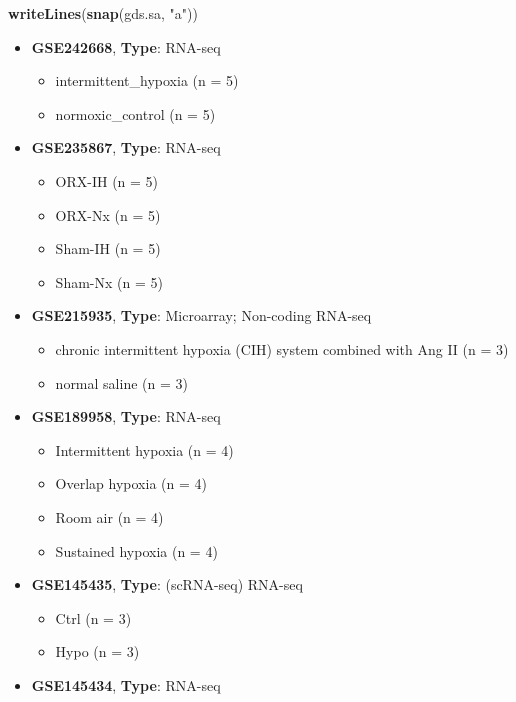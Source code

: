 \documentclass[
]{article}
\newenvironment{Shaded}{\begin{snugshade}}{\end{snugshade}}
\newcommand{\KeywordTok}[1]{\textcolor[rgb]{0.13,0.29,0.53}{\textbf{#1}}}
\newcommand{\NormalTok}[1]{#1}
\newcommand{\StringTok}[1]{\textcolor[rgb]{0.31,0.60,0.02}{#1}}
\providecommand{\tightlist}{%
  \setlength{\itemsep}{0pt}\setlength{\parskip}{0pt}}
\begin{document}
\begin{Shaded}
\begin{Highlighting}[]
\KeywordTok{writeLines}\NormalTok{(}\KeywordTok{snap}\NormalTok{(gds.sa, }\StringTok{"a"}\NormalTok{))}
\end{Highlighting}
\end{Shaded}

\begin{itemize}
\tightlist
\item
  \textbf{GSE242668}, \textbf{Type}: RNA-seq

  \begin{itemize}
  \tightlist
  \item
    intermittent\_hypoxia (n = 5)
  \item
    normoxic\_control (n = 5)
  \end{itemize}
\item
  \textbf{GSE235867}, \textbf{Type}: RNA-seq

  \begin{itemize}
  \tightlist
  \item
    ORX-IH (n = 5)
  \item
    ORX-Nx (n = 5)
  \item
    Sham-IH (n = 5)
  \item
    Sham-Nx (n = 5)
  \end{itemize}
\item
  \textbf{GSE215935}, \textbf{Type}: Microarray; Non-coding RNA-seq

  \begin{itemize}
  \tightlist
  \item
    chronic intermittent hypoxia (CIH) system combined with Ang II (n = 3)
  \item
    normal saline (n = 3)
  \end{itemize}
\item
  \textbf{GSE189958}, \textbf{Type}: RNA-seq

  \begin{itemize}
  \tightlist
  \item
    Intermittent hypoxia (n = 4)
  \item
    Overlap hypoxia (n = 4)
  \item
    Room air (n = 4)
  \item
    Sustained hypoxia (n = 4)
  \end{itemize}
\item
  \textbf{GSE145435}, \textbf{Type}: (scRNA-seq) RNA-seq

  \begin{itemize}
  \tightlist
  \item
    Ctrl (n = 3)
  \item
    Hypo (n = 3)
  \end{itemize}
\item
  \textbf{GSE145434}, \textbf{Type}: RNA-seq


\end{itemize}
\end{document}
